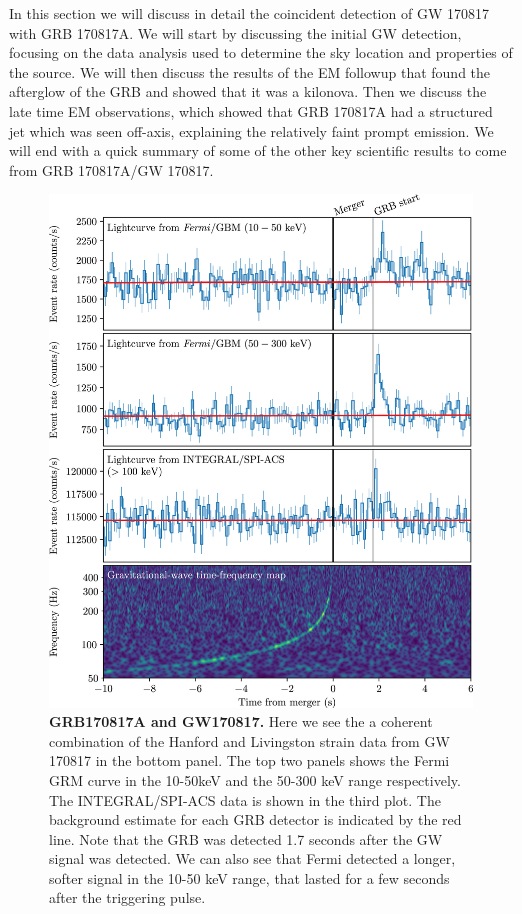 \documentclass[11pt]{cuthesis}
\begin{document}
In this section we will discuss in detail the coincident detection of GW 170817 with GRB 170817A. We will start by discussing the initial GW detection, focusing on the data analysis used to determine the sky location and properties of the source. We will then discuss the results of the EM followup that found the afterglow of the GRB and showed that it was a kilonova. Then we discuss the late time EM observations, which showed that GRB 170817A had a structured jet which was seen off-axis, explaining the relatively faint prompt emission. We will end with a quick summary of some of the other key scientific results to come from GRB 170817A/GW 170817. 

\begin{figure} %
\begin{center}
\includegraphics[width=0.8\linewidth]{grb-gw-170817.jpg}
\end{center}
\caption{\textbf{GRB170817A and GW170817.} Here we see the a coherent combination of the Hanford and Livingston strain data from GW 170817 in the bottom panel. The top two panels shows the Fermi GRM curve in the 10-50keV and the 50-300 keV range respectively. The INTEGRAL/SPI-ACS data is shown in the third plot. The background estimate for each GRB detector is indicated by the red line. Note that the GRB was detected 1.7 seconds after the GW signal was detected. We can also see that Fermi detected a longer, softer signal in the 10-50 keV range, that lasted for a few seconds after the triggering pulse. \cite{GW170817_GRB} }
\label{fig:grb gw 170817}
\end{figure}
\end{document}
